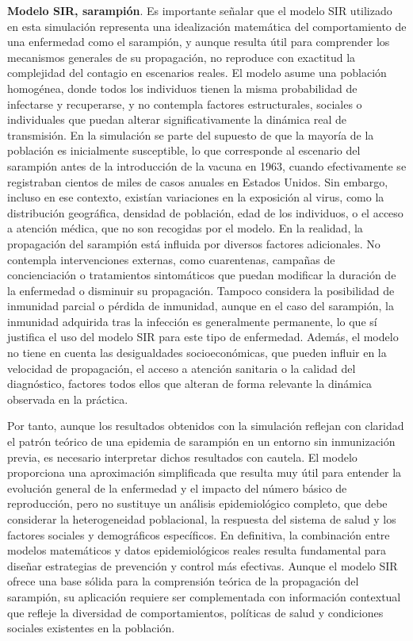 \textbf{Modelo SIR, sarampión}. Es importante señalar que el modelo SIR utilizado en esta simulación representa una idealización matemática del comportamiento de una enfermedad como el sarampión, y aunque resulta útil para comprender los mecanismos generales de su propagación, no reproduce con exactitud la complejidad del contagio en escenarios reales.
El modelo asume una población homogénea, donde todos los individuos tienen la misma probabilidad de infectarse y recuperarse, y no contempla factores estructurales, sociales o individuales que puedan alterar significativamente la dinámica real de transmisión. En la simulación se parte del supuesto de que la mayoría de la población es inicialmente susceptible, lo que corresponde al escenario del sarampión antes de la introducción de la vacuna en 1963, cuando efectivamente se registraban cientos de miles de casos anuales en Estados Unidos. Sin embargo, incluso en ese contexto, existían variaciones en la exposición al virus, como la distribución geográfica, densidad de población, edad de los individuos, o el acceso a atención médica, que no son recogidas por el modelo.
En la realidad, la propagación del sarampión está influida por diversos factores adicionales.
No contempla intervenciones externas, como cuarentenas, campañas de concienciación o tratamientos sintomáticos que puedan modificar la duración de la enfermedad o disminuir su propagación. Tampoco considera la posibilidad de inmunidad parcial o pérdida de inmunidad, aunque en el caso del sarampión, la inmunidad adquirida tras la infección es generalmente permanente, lo que sí justifica el uso del modelo SIR para este tipo de enfermedad.
Además, el modelo no tiene en cuenta las desigualdades socioeconómicas, que pueden influir en la velocidad de propagación, el acceso a atención sanitaria o la calidad del diagnóstico, factores todos ellos que alteran de forma relevante la dinámica observada en la práctica.

Por tanto, aunque los resultados obtenidos con la simulación reflejan con claridad el patrón teórico de una epidemia de sarampión en un entorno sin inmunización previa, es necesario interpretar dichos resultados con cautela. El modelo proporciona una aproximación simplificada que resulta muy útil para entender la evolución general de la enfermedad y el impacto del número básico de reproducción, pero no sustituye un análisis epidemiológico completo, que debe considerar la heterogeneidad poblacional, la respuesta del sistema de salud y los factores sociales y demográficos específicos.
En definitiva, la combinación entre modelos matemáticos y datos epidemiológicos reales resulta fundamental para diseñar estrategias de prevención y control más efectivas. Aunque el modelo SIR ofrece una base sólida para la comprensión teórica de la propagación del sarampión, su aplicación requiere ser complementada con información contextual que refleje la diversidad de comportamientos, políticas de salud y condiciones sociales existentes en la población.


